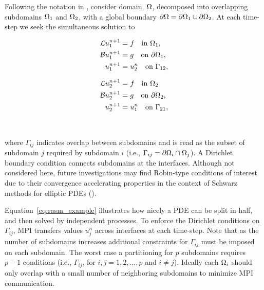 \documentclass{report}
\begin{document}
Following the notation in \cite{StCyr2007}, consider domain, $\Omega$, decomposed into overlapping subdomains $\Omega_1$ and $\Omega_2$, with a global boundary $\partial \Omega = \partial \Omega_1 \cup \partial \Omega_2$. At each time-step we seek the simultaneous solution to
\begin{center}
\begin{minipage}{0.4\linewidth}
\begin{align*}
\mathcal{L}u_{1}^{n+1} & = f \ \ \text{ in }\Omega_1,\\
\mathcal{B}u_{1}^{n+1} &= g \ \ \text{ on }\partial \Omega_1, \\
u_{1}^{n+1} & = u_2^{n} \ \ \text{ on }\Gamma_{12}, 
\end{align*}
\end{minipage}
\begin{minipage}{0.4\linewidth} 
\begin{align}
\mathcal{L}u_{2}^{n+1} & = f \ \ \text{ in }\Omega_2 \nonumber \\
\mathcal{B}u_{2}^{n+1} & = g \ \ \text{ on }\partial \Omega_2, \label{eq:rasm_example} \\
u_{2}^{n+1} & = u_1^{n} \ \ \text{ on }\Gamma_{21},  \nonumber
\end{align}
\end{minipage}
\end{center}
\ 

\noindent where $\Gamma_{ij}$ indicates overlap between subdomains and is read as the subset of subdomain $j$ required by subdomain $i$ (i.e., $\Gamma_{ij} = \partial \Omega_i \cap \Omega_j$). A Dirichlet boundary condition connects subdomains at the interfaces. Although not considered here, future investigations may find Robin-type conditions of interest due to their convergence accelerating properties in the context of Schwarz methods for elliptic PDEs (\cite{StCyr2007}). 

Equation~\ref{eq:rasm_example} illustrates how nicely a PDE can be split in half, and then solved by independent processes. To enforce the Dirichlet conditions on $\Gamma_{ij}$, MPI transfers values $u_j^{n}$ across interfaces at each time-step. Note that as the number of subdomains increases additional constraints for $\Gamma_{ij}$ must be imposed on each subdomain. The worst case a partitioning for $p$ subdomains requires $p-1$ conditions (i.e., $\Gamma_{ij}$, for $i,j=1,2,...,p$ and $i \neq j$). Ideally each $\Omega_i$ should only overlap with a small number of neighboring subdomains to minimize MPI communication. 
\end{document}
